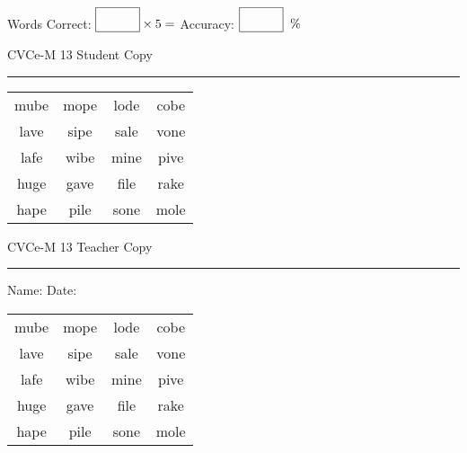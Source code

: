 \documentclass{memoir}
\begin{document}
\small

Words Correct: $\fbox{\phantom{\huge 100}} \times 5 = $ Accuracy: $\fbox{\phantom{\huge 100}}\;\; \%$ 

\vfill

\newpage


\footnotesize \noindent
CVCe-M 13 \hfill Student Copy
\smallskip
\hrule

\Large

\setlength{\tabcolsep}{14pt}
\def\arraystretch{2}

{\selectfont


\begin{vplace}[0.5]
\begin{center}
\begin{tabular}{cccc}
mube & mope & lode & cobe \\
lave & sipe & sale & vone \\
lafe & wibe & mine & pive \\
huge & gave & file & rake \\
hape & pile & sone & mole \\
\end{tabular}
\end{center}
\end{vplace}

}

\newpage

\footnotesize \noindent
CVCe-M 13 \hfill Teacher Copy
\smallskip
\hrule

\small

\vfill

\noindent
Name: \underline{\hspace{1.75in}} \hfill Date: \underline{\hspace{1in}}

\Large

{\selectfont


\begin{vplace}[0.5]
\begin{center}
\begin{tabular}{cccc}
mube & mope & lode & cobe \\
lave & sipe & sale & vone \\
lafe & wibe & mine & pive \\
huge & gave & file & rake \\
hape & pile & sone & mole \\
\end{tabular}
\end{center}
\end{vplace}



}
\end{document}
